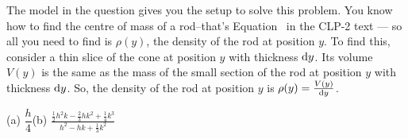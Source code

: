 \begin{hint}
The model in the question gives you the setup to solve this problem. You know how to find the centre of mass of a rod--that's
 Equation~ in the CLP-2 text --- so all you need to find is $\rho(y)$, the density of the rod at position $y$. To find this, consider a thin slice of the cone at position $y$ with thickness $\mathrm{d}y$. Its volume $V(y)$ is the same as the mass of the small section of the rod at position $y$ with thickness $\mathrm{d}y$. So, the density of the rod at position $y$ is $\rho(y)=\frac{V(y)}{\mathrm{d}y}$.
\end{hint}
\begin{answer}
(a) $\dfrac{h}{4}$\qquad (b) $\displaystyle\frac{\frac{1}{2}h^2k - \frac{2}{3}hk^2+\frac{1}{4}k^3}{h^2-hk+\frac{1}{3}k^2}$
\end{answer}
